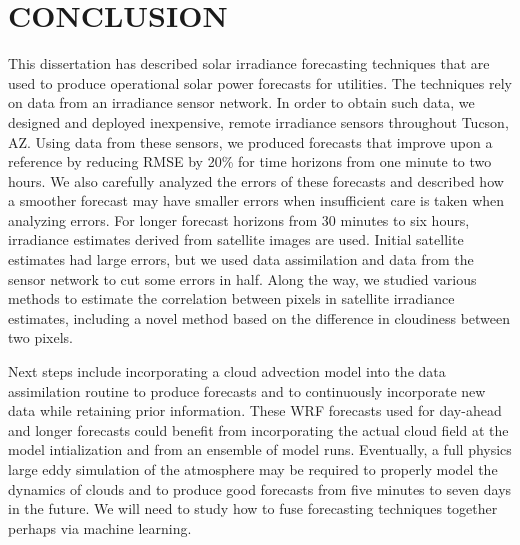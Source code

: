 \chapter{CONCLUSION}
\label{chap:conc}

This dissertation has described solar irradiance forecasting
techniques that are used to produce operational solar power forecasts
for utilities.
The techniques rely on data from an irradiance sensor network.
In order to obtain such data, we designed and deployed inexpensive,
remote irradiance sensors throughout Tucson, AZ.
Using data from these sensors, we produced forecasts that improve upon
a reference by reducing RMSE by 20\% for time horizons from one minute
to two hours.
We also carefully analyzed the errors of these forecasts and described
how a smoother forecast may have smaller errors when insufficient care
is taken when analyzing errors.
For longer forecast horizons from 30 minutes to six hours, irradiance
estimates derived from satellite images are used.
Initial satellite estimates had large errors, but we used data
assimilation and data from the sensor network to cut some errors in
half.
Along the way, we studied various methods to estimate the correlation
between pixels in satellite irradiance estimates, including a novel
method based on the difference in cloudiness between two pixels.

Next steps include incorporating a cloud advection model into the data
assimilation routine to produce forecasts and to continuously
incorporate new data while retaining prior information.
These WRF forecasts used for day-ahead and longer forecasts could
benefit from incorporating the actual cloud field at the model
intialization and from an ensemble of model runs.
Eventually, a full physics large eddy simulation of the atmosphere may
be required to properly model the dynamics of clouds and to produce
good forecasts from five minutes to seven days in the future.
We will need to study how to fuse forecasting techniques together
perhaps via machine learning.


